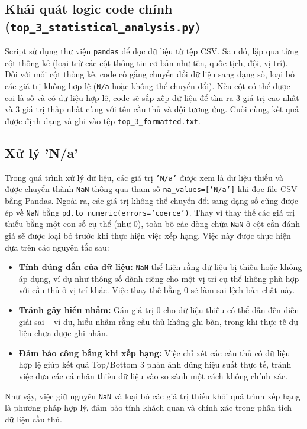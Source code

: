 \documentclass[12pt, a4paper]{report}
\begin{document}
\subsection{Khái quát logic code chính \newline (\texttt{top\_3\_statistical\_analysis.py})}
Script sử dụng thư viện \texttt{pandas} để đọc dữ liệu từ tệp CSV.
Sau đó, lặp qua từng cột thống kê (loại trừ các cột thông tin cơ bản như tên, quốc tịch, đội, vị trí).
Đối với mỗi cột thống kê, code cố gắng chuyển đổi dữ liệu sang dạng số, loại bỏ các giá trị không hợp lệ (\texttt{N/a} hoặc không thể chuyển đổi).
Nếu cột có thể được coi là số và có dữ liệu hợp lệ, code sẽ sắp xếp dữ liệu để tìm ra 3 giá trị cao nhất và 3 giá trị thấp nhất cùng với tên cầu thủ và đội tương ứng.
Cuối cùng, kết quả được định dạng và ghi vào tệp \texttt{top\_3\_formatted.txt}.

\subsection{Xử lý 'N/a'}
Trong quá trình xử lý dữ liệu, các giá trị \texttt{'N/a'} được xem là dữ liệu thiếu và được chuyển thành \texttt{NaN} thông qua tham số \texttt{na\_values=['N/a']} khi đọc file CSV bằng Pandas.
Ngoài ra, các giá trị không thể chuyển đổi sang dạng số cũng được ép về \texttt{NaN} bằng \texttt{pd.to\_numeric(errors='coerce')}.
Thay vì thay thế các giá trị thiếu bằng một con số cụ thể (như 0), toàn bộ các dòng chứa \texttt{NaN} ở cột cần đánh giá sẽ được loại bỏ trước khi thực hiện việc xếp hạng.
Việc này được thực hiện dựa trên các nguyên tắc sau:
\begin{itemize}
    \item \textbf{Tính đúng đắn của dữ liệu:} \texttt{NaN} thể hiện rằng dữ liệu bị thiếu hoặc không áp dụng, ví dụ như thông số dành riêng cho một vị trí cụ thể không phù hợp với cầu thủ ở vị trí khác. Việc thay thế bằng 0 sẽ làm sai lệch bản chất này.
    \item \textbf{Tránh gây hiểu nhầm:} Gán giá trị 0 cho dữ liệu thiếu có thể dẫn đến diễn giải sai – ví dụ, hiểu nhầm rằng cầu thủ không ghi bàn, trong khi thực tế dữ liệu chưa được ghi nhận.
    \item \textbf{Đảm bảo công bằng khi xếp hạng:} Việc chỉ xét các cầu thủ có dữ liệu hợp lệ giúp kết quả Top/Bottom 3 phản ánh đúng hiệu suất thực tế, tránh việc đưa các cá nhân thiếu dữ liệu vào so sánh một cách không chính xác.
\end{itemize}
Như vậy, việc giữ nguyên \texttt{NaN} và loại bỏ các giá trị thiếu khỏi quá trình xếp hạng là phương pháp hợp lý, đảm bảo tính khách quan và chính xác trong phân tích dữ liệu cầu thủ.
\end{document}
